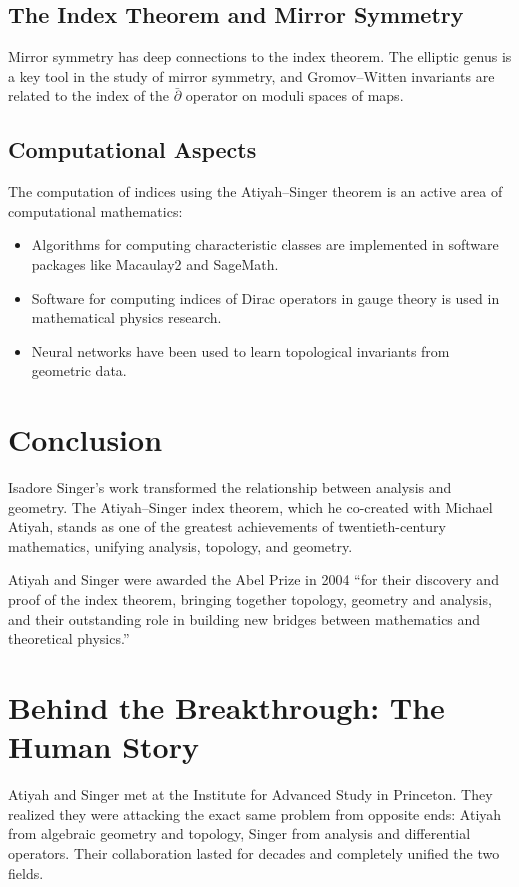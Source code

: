 \subsection{The Index Theorem and Mirror Symmetry}

Mirror symmetry has deep connections to the index theorem. The elliptic genus is a key tool in the study of mirror symmetry, and Gromov--Witten invariants are related to the index of the $\bar\partial$ operator on moduli spaces of maps.

\subsection{Computational Aspects}

The computation of indices using the Atiyah--Singer theorem is an active area of computational mathematics:
\begin{itemize}
\item Algorithms for computing characteristic classes are implemented in software packages like Macaulay2 and SageMath.
\item Software for computing indices of Dirac operators in gauge theory is used in mathematical physics research.
\item Neural networks have been used to learn topological invariants from geometric data.
\end{itemize}

\section{Conclusion}

Isadore Singer's work transformed the relationship between analysis and geometry. The Atiyah--Singer index theorem, which he co-created with Michael Atiyah, stands as one of the greatest achievements of twentieth-century mathematics, unifying analysis, topology, and geometry.

Atiyah and Singer were awarded the Abel Prize in 2004 ``for their discovery and proof of the index theorem, bringing together topology, geometry and analysis, and their outstanding role in building new bridges between mathematics and theoretical physics.''


\section{Behind the Breakthrough: The Human Story}
Atiyah and Singer met at the Institute for Advanced Study in Princeton. They realized they were attacking the exact same problem from opposite ends: Atiyah from algebraic geometry and topology, Singer from analysis and differential operators. Their collaboration lasted for decades and completely unified the two fields.

